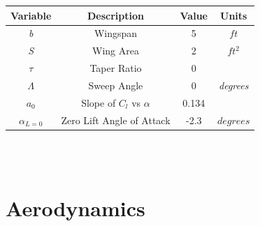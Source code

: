 \documentclass{article}
\begin{document}
\begin{center}
\begin{tabular}[pos]{| c | c | c | c | }
\hline
\textbf{Variable} & \textbf{Description} & \textbf{Value} & \textbf{Units} \\ \hline
\textit{b} & Wingspan & 5 & $ft$ \\ \hline
\textit{S} & Wing Area & 2 & $ft^2$ \\ \hline
$\tau$ & Taper Ratio & 0 & \\ \hline
$\Lambda$ & Sweep Angle & 0 & \textit{degrees} \\ \hline
\textit{$a_0$} & Slope of $C_l$ vs $\alpha$ & 0.134 & \\ \hline
$\alpha_{L=0}$ & Zero Lift Angle of Attack & -2.3 & $degrees$ \\ \hline
\end{tabular} \\~\\
\end{center}

\newpage
\section{Aerodynamics}
\end{document}
